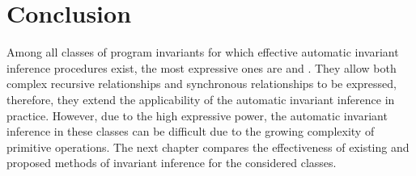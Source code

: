 \section{Conclusion}
Among all classes of program invariants for which effective automatic invariant inference procedures exist, the most expressive ones are \syncRegFullClass{} and \regelemclass{}. They allow both complex recursive relationships and synchronous relationships to be expressed, therefore, they extend the applicability of the automatic invariant inference in practice. However, due to the high expressive power, the automatic invariant inference in these classes can be difficult due to the growing complexity of primitive operations.
The next chapter compares the effectiveness of existing and proposed methods of invariant inference for the considered classes.
